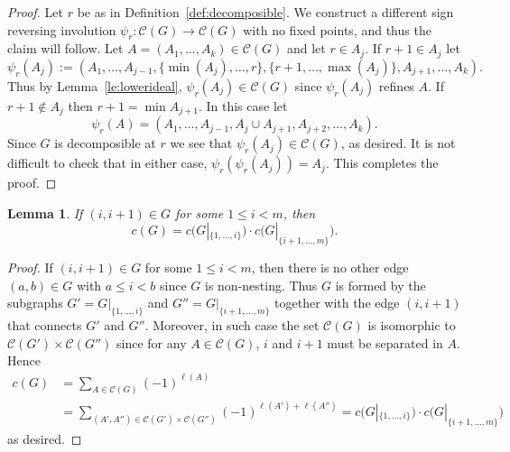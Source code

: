 \documentclass[10pt]{amsart}
\newtheorem{lemma}[theorem]{Lemma}
\theoremstyle{definition}
\begin{document}
\begin{proof}
Let $r$ be as in Definition~\ref{def:decomposible}. We construct a different sign reversing involution $\psi_r\colon \mathcal{C}(G)\to \mathcal{C}(G)$ with no fixed points, and thus the claim will follow. Let $A=(A_1,\ldots,A_k)\in \mathcal{C}(G)$ and let $r\in A_j$. If $r+1\in A_j$ let 
$$
\psi_r(A_j) :=(A_1,\ldots,A_{j-1},\{\min(A_j),\ldots,r\},\{r+1,\ldots,\max(A_j)\},A_{j+1},\ldots,A_k) .
$$
Thus by Lemma~\ref{le:lowerideal}, $\psi_r(A_j) \in \mathcal{C}(G)$ since $\psi_r(A_j)$ refines $A$. If $r+1\notin A_j$ then $r+1=\min A_{j+1}$. In this case let
$$\psi_r(A)=(A_1,\ldots,A_{j-1},A_j\cup A_{j+1},A_{j+2},\ldots,A_k).$$ Since $G$ is decomposible at $r$ we see that $\psi_r(A_j) \in \mathcal{C}(G) $, as desired. It is not difficult to check that in either case, $\psi_r(\psi_r(A_j))= A_j$. This completes the proof.
% 
\end{proof}

\begin{lemma}\label{le:shortedge}
 If $(i,i+1)\in G$ for some $1\le i<m$, then 
 $$ c(G)= c\big(G|_{\{1,\ldots, i\}}\big)\cdot c\big(G|_{\{i+1,\ldots, m\}}\big) .$$
\end{lemma}
\begin{proof} If $(i,i+1)\in G$ for some $1\le i<m$, then there is no other edge $(a,b)\in G$ with $a\le i<b$ since $G$ is non-nesting. Thus $G$ is formed by the subgraphs $G' = G|_{\{1,\ldots, i\}}$ and $G''=G|_{\{i+1,\ldots, m\}}$ together with the edge $(i,i+1)$ that connects $G'$ and $G''$. Moreover, in such case the set $\mathcal{C}(G)$ is isomorphic to $\mathcal{C}(G')\times \mathcal{C}(G'')$ since for any $A\in\mathcal{C}(G)$, $i$ and $i+1$ must be separated in $A$.
%
Hence
$$ 
\begin{aligned}
c(G) &= \sum_{A\in \mathcal{C}(G)} (-1)^{\ell(A)} 
\\
&= \sum_{(A',A'')\in \mathcal{C}(G')\times \mathcal{C}(G'')} (-1)^{\ell(A')+\ell(A'')}= c\big(G|_{\{1,\ldots, i\}}\big)\cdot c\big(G|_{\{i+1,\ldots, m\}}\big) 
\end{aligned}
$$
as desired. \end{proof}
\end{document}
